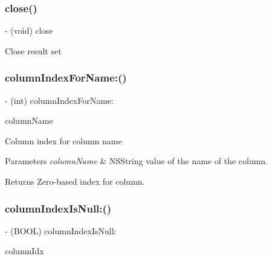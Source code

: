 \subsubsection{\texorpdfstring{close()}{close()}}
{\footnotesize\ttfamily -\/ (void) close \begin{DoxyParamCaption}{ }\end{DoxyParamCaption}}

Close result set \mbox{\label{interface_o_p_t_l_y_f_m_d_b_result_set_a5c0e3b88a4b01e1a0975e348eeabac0e}} 
\subsubsection{\texorpdfstring{column\+Index\+For\+Name\+:()}{columnIndexForName:()}}
{\footnotesize\ttfamily -\/ (int) column\+Index\+For\+Name\+: \begin{DoxyParamCaption}\item[{(N\+S\+String$\ast$)}]{column\+Name }\end{DoxyParamCaption}}

Column index for column name


\begin{DoxyParams}{Parameters}
{\em column\+Name} & {\ttfamily N\+S\+String} value of the name of the column.\\
\hline
\end{DoxyParams}
\begin{DoxyReturn}{Returns}
Zero-\/based index for column. 
\end{DoxyReturn}
\mbox{\label{interface_o_p_t_l_y_f_m_d_b_result_set_abd2a9b52acb48553a5a57f21a4e23b8d}} 
\subsubsection{\texorpdfstring{column\+Index\+Is\+Null\+:()}{columnIndexIsNull:()}}
{\footnotesize\ttfamily -\/ (B\+O\+OL) column\+Index\+Is\+Null\+: \begin{DoxyParamCaption}\item[{(int)}]{column\+Idx }\end{DoxyParamCaption}}

